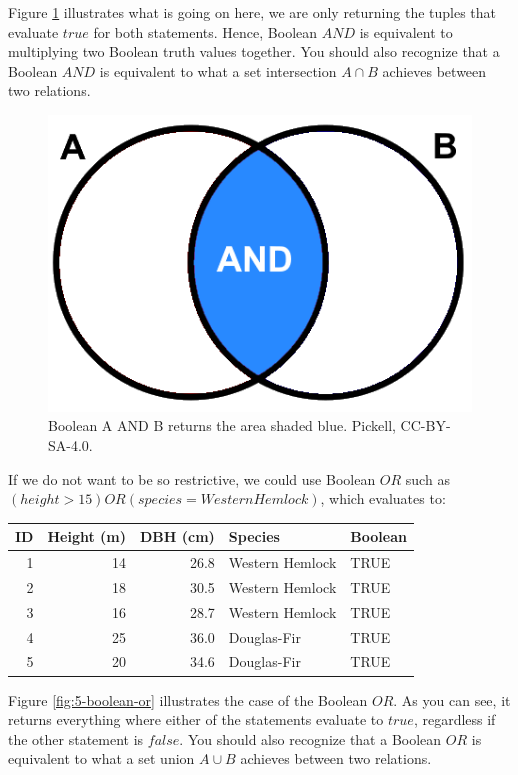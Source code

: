 \documentclass[
]{book}
\begin{document}
Figure \ref{fig:5-boolean-and} illustrates what is going on here, we are only returning the tuples that evaluate \(true\) for both statements. Hence, Boolean \(AND\) is equivalent to multiplying two Boolean truth values together. You should also recognize that a Boolean \(AND\) is equivalent to what a set intersection \(A∩B\) achieves between two relations.

\begin{figure}
\includegraphics[width=0.75\linewidth]{images/05-boolean-and} \caption{Boolean A AND B returns the area shaded blue. Pickell, CC-BY-SA-4.0.}\label{fig:5-boolean-and}
\end{figure}

If we do not want to be so restrictive, we could use Boolean \(OR\) such as \((height>15)OR(species=WesternHemlock)\), which evaluates to:

\begin{tabular}{rrrll}
\toprule
ID & Height (m) & DBH (cm) & Species & Boolean\\
\midrule
1 & 14 & 26.8 & Western Hemlock & TRUE\\
2 & 18 & 30.5 & Western Hemlock & TRUE\\
3 & 16 & 28.7 & Western Hemlock & TRUE\\
4 & 25 & 36.0 & Douglas-Fir & TRUE\\
5 & 20 & 34.6 & Douglas-Fir & TRUE\\
\bottomrule
\end{tabular}

Figure \ref{fig:5-boolean-or} illustrates the case of the Boolean \(OR\). As you can see, it returns everything where either of the statements evaluate to \(true\), regardless if the other statement is \(false\). You should also recognize that a Boolean \(OR\) is equivalent to what a set union \(A∪B\) achieves between two relations.
\end{document}

